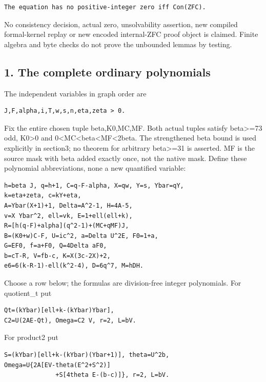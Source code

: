 \begin{verbatim}
The equation has no positive-integer zero iff Con(ZFC).
\end{verbatim}

No consistency decision, actual zero, unsolvability assertion, new
compiled formal-kernel replay or new encoded internal-ZFC proof object
is claimed. Finite algebra and byte checks do not prove the unbounded
lemmas by testing.

\subsection{1. The complete ordinary
polynomials}\label{the-complete-ordinary-polynomials}

The independent variables in graph order are

\begin{verbatim}
J,F,alpha,i,T,w,s,n,eta,zeta > 0.
\end{verbatim}

Fix the entire chosen tuple beta,K0,MC,MF. Both actual tuples satisfy
beta\textgreater=73 odd, K0\textgreater0 and
0\textless MC\textless beta\textless MF\textless2beta. The strengthened
beta bound is used explicitly in section3; no theorem for arbitrary
beta\textgreater=31 is asserted. MF is the source mask with beta added
exactly once, not the native mask. Define these polynomial
abbreviations, none a new quantified variable:

\begin{verbatim}
h=beta J, q=h+1, C=q-F-alpha, X=qw, Y=s, Ybar=qY,
k=eta+zeta, c=kY+eta,
A=Ybar(X+1)+1, Delta=A^2-1, H=4A-5,
v=X Ybar^2, ell=vk, E=1+ell(ell+k),
R=[h(q-F)+alpha](q^2-1)+(MC+qMF)J,
B=(K0+w)C-F, U=ic^2, a=Delta U^2E, F0=1+a,
G=EF0, f=a+F0, Q=4Delta aF0,
b=cT-R, V=fb-c, K=X(3c-2X)+2,
e6=6(k-R-1)-ell(k^2-4), D=6q^7, M=hDH.
\end{verbatim}

Choose a row below; the formulas are division-free integer polynomials.
For quotient\_t put

\begin{verbatim}
Qt=(kYbar)[ell+k-(kYbar)Ybar],
C2=U(2AE-Qt), Omega=C2 V, r=2, L=bV.
\end{verbatim}

For product2 put

\begin{verbatim}
S=(kYbar)[ell+k-(kYbar)(Ybar+1)], theta=U^2b,
Omega=U{2A[EV-theta(E^2+S^2)]
              +S[4theta E-(b-c)]}, r=2, L=bV.
\end{verbatim}

